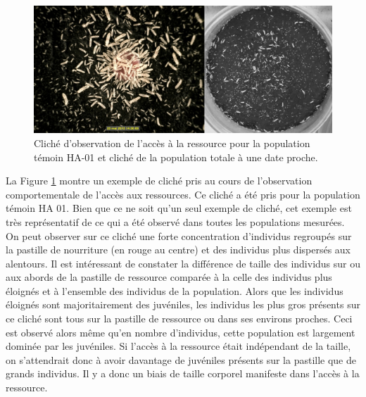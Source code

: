 \begin{figure}[!ht]
\begin{center}
\includegraphics[width=1\textwidth]{1_CorpsDeThese/Resumes/Fig/SM05b}
\caption[Cliché
d'observation de l'accès à la ressource]{Cliché
d'observation de l'accès à la ressource pour la population témoin HA-01 et
cliché de la population totale à une date proche.}
\label{fig:SM5}
\end{center}
\end{figure}

La Figure \ref{fig:SM5} montre un exemple de cliché pris au cours de
l'observation comportementale de l'accès aux ressources. Ce cliché a été pris
pour la population témoin HA 01. Bien que ce ne soit qu'un seul exemple de
cliché, cet exemple est très représentatif de ce qui a été observé dans toutes
les populations mesurées. On peut observer sur ce cliché une forte concentration
d'individus regroupés sur la pastille de nourriture (en rouge au centre) et des
individus plus dispersés aux alentours. Il est intéressant de constater la
différence de taille des individus sur ou aux abords de la pastille de ressource
comparée à la celle des individus plus éloignés et à l'ensemble des individus de
la population. Alors que les individus éloignés sont majoritairement des
juvéniles, les individus les plus gros présents sur ce cliché sont tous sur la
pastille de ressource ou dans ses environs proches.
Ceci est observé alors même qu'en nombre d'individus, cette population est
largement dominée par les juvéniles. Si l'accès à la ressource était indépendant
de la taille, on s'attendrait donc à avoir davantage de juvéniles présents sur
la pastille que de grands individus. Il y a donc un biais de taille corporel
manifeste dans l'accès à la ressource.

